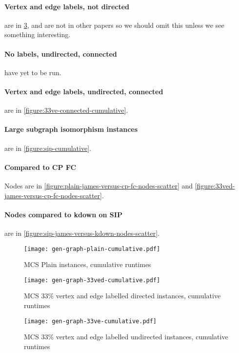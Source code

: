 \documentclass[letterpaper]{article}
\begin{document}
\paragraph{Vertex and edge labels, not directed} are in \cref{figure:33ve-cumulative}, and are not in other papers so we should omit this unless we see something interesting.

\paragraph{No labels, undirected, connected} have yet to be run.

\paragraph{Vertex and edge labels, undirected, connected} are in \cref{figure:33ve-connected-cumulative}.

\paragraph{Large subgraph isomorphism instances} are in \cref{figure:sip-cumulative}.

\paragraph{Compared to CP FC} Nodes are in \cref{figure:plain-james-versus-cp-fc-nodes-scatter} and \cref{figure:33ved-james-versus-cp-fc-nodes-scatter}.

\paragraph{Nodes compared to kdown on SIP} are in \cref{figure:sip-james-versus-kdown-nodes-scatter}.

\begin{figure}
    \centering
    \texttt{[image: gen-graph-plain-cumulative.pdf]}
    \caption{MCS Plain instances, cumulative runtimes}\label{figure:plain-cumulative}
\end{figure}

\begin{figure}
    \centering
    \texttt{[image: gen-graph-33ved-cumulative.pdf]}
    \caption{MCS 33\% vertex and edge labelled directed instances, cumulative runtimes}\label{figure:33ved-cumulative}
\end{figure}

\begin{figure}
    \centering
    \texttt{[image: gen-graph-33ve-cumulative.pdf]}
    \caption{MCS 33\% vertex and edge labelled undirected instances, cumulative runtimes}\label{figure:33ve-cumulative}
\end{figure}
\end{document}
